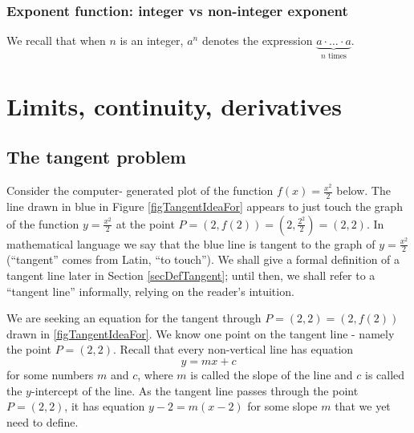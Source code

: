 \documentclass[12pt]{book}
\begin{document}





 
\subsection{Exponent function: integer vs non-integer exponent}
We recall that when $n$ is an integer,  $a^{n}$ denotes the expression $\underbrace{a\cdot\dots \cdot a}_{n\text{ times}}$.

\chapter{Limits, continuity, derivatives}
\section{The tangent problem}
Consider the computer- generated plot of the function $f(x)=\frac{x^2}2$ below. The line drawn in blue in Figure \ref{figTangentIdeaFor} appears to just touch the graph of the function $y=\frac{x^2}2$ at the point $P=(2,f(2))=(2, \frac{2^2}{2}) =(2,2)$. In mathematical language we say that the blue line is tangent to the graph of $ y=\frac{x^2}2$ (``tangent'' comes from Latin, ``to touch''). We shall give a formal definition of a tangent line later in Section \ref{secDefTangent}; until then, we shall refer to a ``tangent line'' informally, relying on the reader's intuition.

We are seeking an equation for the tangent through $P=(2,2)=(2, f(2))$ drawn in \ref{figTangentIdeaFor}. We know one point on the tangent line - namely the point $P=(2,2)$. Recall that every non-vertical line has equation
\[
y=mx+c
\]
for some numbers $m$ and $c$, where $m$ is called the slope
of the line and $c$ is called the $y$-intercept of the line. As the tangent line passes through the point $P=(2,2)$, it has equation $y-2=m(x-2)$ for some slope $m$ that we yet need to define.
\end{document}
